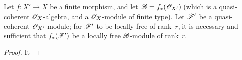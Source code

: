 \begin{proposition}[6.1.12]
\label{II.6.1.12}
Let $f:X'\to X$ be a finite morphism, and let $\mathscr{B}=f_*(\mathscr{O}_{X'})$ (which is a quasi-coherent $\mathscr{O}_X$-algebra, and a $\mathscr{O}_X$-module of finite type).
Let $\mathscr{F}'$ be a quasi-coherent $\mathscr{O}_{X'}$-module;
for $\mathscr{F}'$ to be locally free of rank~$r$, it is necessary and sufficient that $f_*(\mathscr{F}')$ be a locally free $\mathscr{B}$-module of rank~$r$.
\end{proposition}

\begin{proof}
It
\end{proof}












